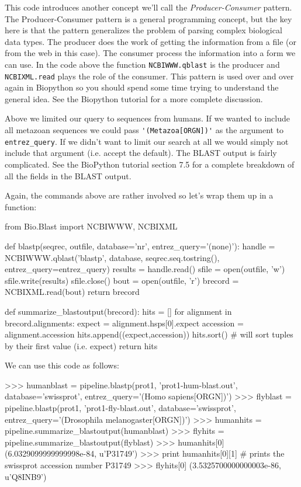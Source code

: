 \documentclass[10pt,letterpaper]{scrartcl}
\begin{document}
This code introduces another concept we'll call the \emph{Producer-Consumer} pattern. The Producer-Consumer pattern is a general programming concept, but the key here is that the pattern generalizes the problem of parsing complex biological data types. The producer does the work of getting the information from a file (or from the web in this case). The consumer process the information into a form we can use. In the code above the function \verb=NCBIWWW.qblast= is the producer and \verb=NCBIXML.read= plays the role of the consumer. This pattern is used over and over again in Biopython so you should spend some time trying to understand the general idea. See the Biopython tutorial for a more complete discussion.

Above we limited our query to sequences from humans. If we wanted to include all metazoan sequences we could pass \verb='(Metazoa[ORGN])'= as the argument to \verb=entrez_query=. If we didn't want to limit our search at all we would simply not include that argument (i.e. accept the default). The BLAST output is fairly complicated. See the BioPython tutorial section 7.5 for a complete breakdown of all the fields in the BLAST output.

Again, the commands above are rather involved so let's wrap them up in a function:

\begin{python}
from Bio.Blast import NCBIWWW, NCBIXML    
    
def blastp(seqrec, outfile, database='nr', entrez_query='(none)'):
    handle = NCBIWWW.qblast('blastp', database, seqrec.seq.tostring(), 
    				entrez_query=entrez_query)
    results = handle.read()
    sfile = open(outfile, 'w')
    sfile.write(results)
    sfile.close()   
    bout = open(outfile, 'r')
    brecord = NCBIXML.read(bout)    
    return brecord

def summarize_blastoutput(brecord):
    hits = []
    for alignment in brecord.alignments:
        expect = alignment.hsps[0].expect
        accession = alignment.accession
        hits.append((expect,accession))
    hits.sort() # will sort tuples by their first value (i.e. expect)
    return hits      
\end{python}

We can use this code as follows:
\begin{python}
>>> humanblast = pipeline.blastp(prot1, 'prot1-hum-blast.out', database='swissprot', 
entrez_query='(Homo sapiens[ORGN])')
>>> flyblast = pipeline.blastp(prot1, 'prot1-fly-blast.out', database='swissprot', 
entrez_query='(Drosophila melanogaster[ORGN])')
>>> humanhits = pipeline.summarize_blastoutput(humanblast)
>>> flyhits = pipeline.summarize_blastoutput(flyblast)
>>> humanhits[0]
(6.0329099999999998e-84, u'P31749')
>>> print humanhits[0][1]  # prints the swissprot accession number
P31749
>>> flyhits[0]
(3.5325700000000003e-86, u'Q8INB9')
\end{python}
\end{document}
